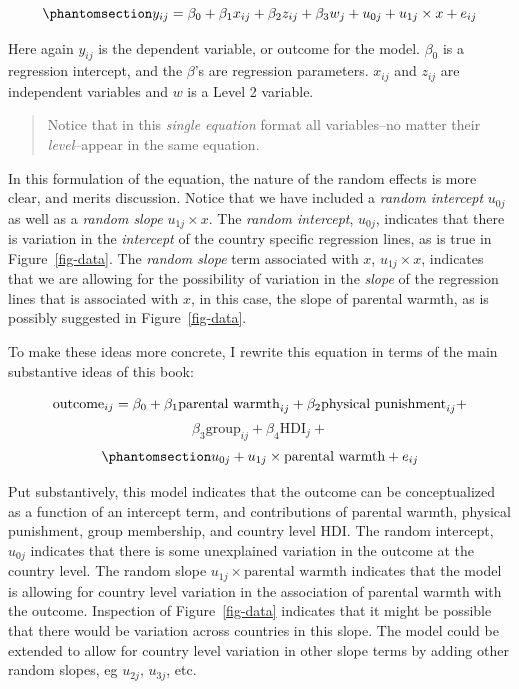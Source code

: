 \documentclass[
  letterpaper,
  DIV=11,
  numbers=noendperiod]{scrreprt}
\begin{document}
\begin{equation}\phantomsection\label{eq-MLM}{y_{ij} = \beta_0 + \beta_1 x_{ij} + \beta_2 z_{ij} + \beta_3 w_{j} + u_{0j} + u_{1j} \times x + e_{ij}}\end{equation}

Here again \(y_{ij}\) is the dependent variable, or outcome for the
model. \(\beta_0\) is a regression intercept, and the \(\beta\)'s are
regression parameters. \(x_{ij}\) and \(z_{ij}\) are independent
variables and \(w\) is a Level 2 variable.

\begin{quote}
Notice that in this \emph{single equation} format all variables--no
matter their \emph{level}--appear in the same equation.
\end{quote}

In this formulation of the equation, the nature of the random effects is
more clear, and merits discussion. Notice that we have included a
\emph{random intercept} \(u_{0j}\) as well as a \emph{random slope}
\(u_{1j} \times x\). The \emph{random intercept}, \(u_{0j}\), indicates
that there is variation in the \emph{intercept} of the country specific
regression lines, as is true in Figure~\ref{fig-data}. The \emph{random
slope} term associated with \(x\), \(u_{1j} \times x\), indicates that
we are allowing for the possibility of variation in the \emph{slope} of
the regression lines that is associated with \(x\), in this case, the
slope of parental warmth, as is possibly suggested in
Figure~\ref{fig-data}.

To make these ideas more concrete, I rewrite this equation in terms of
the main substantive ideas of this book:

\[\text{outcome}_{ij} = \beta_0 + \beta_1 \text{parental warmth}_{ij} + \\ \beta_2 \text{physical punishment}_{ij} +\]
\[\beta_3 \text{group}_{ij} + \beta_4 \text{HDI}_{j} + \]
\begin{equation}\phantomsection\label{eq-MLMsubstantive}{u_{0j} + u_{1j} \times \text{parental warmth} + e_{ij}}\end{equation}

Put substantively, this model indicates that the outcome can be
conceptualized as a function of an intercept term, and contributions of
parental warmth, physical punishment, group membership, and country
level HDI. The random intercept, \(u_{0j}\) indicates that there is some
unexplained variation in the outcome at the country level. The random
slope \(u_{1j} \times \text{parental warmth}\) indicates that the model
is allowing for country level variation in the association of parental
warmth with the outcome. Inspection of Figure~\ref{fig-data} indicates
that it might be possible that there would be variation across countries
in this slope. The model could be extended to allow for country level
variation in other slope terms by adding other random slopes, eg
\(u_{2j}\), \(u_{3j}\), etc.
\end{document}
